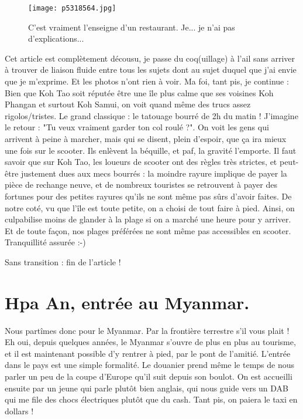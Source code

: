 \documentclass{book}
\begin{document}
\begin{figure}[h]
\centering
\texttt{[image: p5318564.jpg]}
\caption*{C'est vraiment l'enseigne d'un restaurant. Je... je n'ai pas d'explications...}
\end{figure}

Cet article est complètement décousu, je passe du coq(uillage) à l'ail sans arriver à trouver de liaison fluide entre tous les sujets dont au sujet duquel que j'ai envie que je m'exprime. Et les photos n'ont rien à voir. Ma foi, tant pis, je continue : Bien que Koh Tao soit réputée être une île plus calme que ses voisines Koh Phangan et surtout Koh Samui, on voit quand même des trucs assez rigolos/tristes. Le grand classique : le tatouage bourré de 2h du matin ! J'imagine le retour : "Tu veux vraiment garder ton col roulé ?". On voit les gens qui arrivent à peine à marcher, mais qui se disent, plein d'espoir, que ça ira mieux une fois sur le scooter. Ils enlèvent la béquille, et paf, la gravité l'emporte. Il faut savoir que sur Koh Tao, les loueurs de scooter ont des règles très strictes, et peut-être justement dues aux mecs bourrés : la moindre rayure implique de payer la pièce de rechange neuve, et de nombreux touristes se retrouvent à payer des fortunes pour des petites rayures qu'ils ne sont même pas sûrs d'avoir faites. De notre coté, vu que l'île est toute petite, on a choisi de tout faire à pied. Ainsi, on culpabilise moins de glander à la plage si on a marché une heure pour y arriver. Et de toute façon, nos plages préférées ne sont même pas accessibles en scooter. Tranquillité assurée :-)


Sans transition : fin de l'article !



\chapter{Hpa An, entrée au Myanmar.}
Nous partîmes donc pour le Myanmar. Par la frontière terrestre s'il vous plait ! Eh oui, depuis quelques années, le Myanmar s'ouvre de plus en plus au tourisme, et il est maintenant possible d'y rentrer à pied, par le pont de l'amitié. L'entrée dans le pays est une simple formalité. Le douanier prend même le temps de nous parler un peu de la coupe d'Europe qu'il suit depuis son boulot. On est accueilli ensuite par un jeune qui parle plutôt bien anglais, qui nous guide vers un DAB qui me file des chocs électriques plutôt que du cash. Tant pis, on paiera le taxi en dollars !
\end{document}
